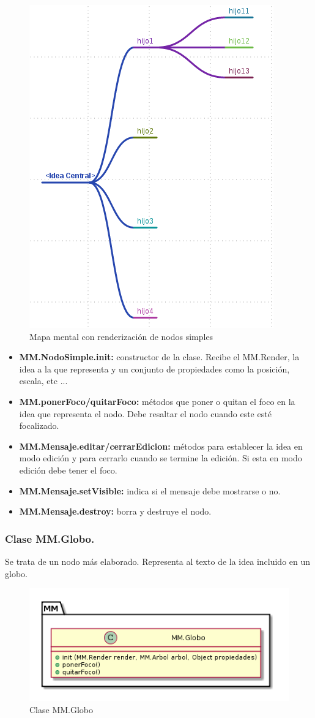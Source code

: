 \begin{figure}[tbph]
\centering
\includegraphics[width=0.5\linewidth]{imagenes/NodoSimple}
\caption{Mapa mental con renderización de nodos simples}
\label{fig:nodosimple}
\end{figure}

\begin{itemize}
\item \textbf{MM.NodoSimple.init:} constructor de la clase. Recibe el MM.Render, la idea a la que representa y un conjunto de propiedades como la posición, escala, etc ...
\item \textbf{MM.ponerFoco/quitarFoco:} métodos que poner o quitan el foco en la idea que representa el nodo. Debe resaltar el nodo cuando este esté focalizado. 
\item \textbf{MM.Mensaje.editar/cerrarEdicion:} métodos para establecer la idea en modo edición y para cerrarlo cuando se termine la edición. Si esta en modo edición debe tener el foco.
\item \textbf{MM.Mensaje.setVisible:} indica si el mensaje debe mostrarse o no.
\item \textbf{MM.Mensaje.destroy:} borra y destruye el nodo.
\end{itemize}


\subsubsection{Clase MM.Globo.}
Se trata de un nodo más elaborado. Representa al texto de la idea incluido en un globo.

\begin{figure}[tbph]
\centering
\includegraphics[width=0.6\linewidth]{imagenes/diagrama-clase-mm-globo}
\caption{Clase MM.Globo}
\label{fig:diagrama-clase-mm-globo}
\end{figure}

